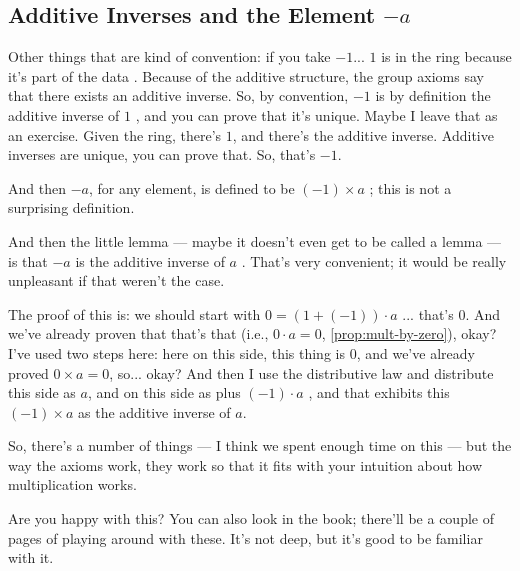 \begin{hidden}
\end{hidden}

\subsection{Additive Inverses and the Element \texorpdfstring{$-a$}{-a}}

\begin{speech}[00:12:43 - 00:15:05]
Other things that are kind of convention: if you take $-1$... $1$ is in the ring because it's part of the data . Because of the additive structure, the group axioms say that there exists an additive inverse. So, by convention, $-1$ is by definition the additive inverse of $1$ , and you can prove that it's unique. Maybe I leave that as an exercise. Given the ring, there's $1$, and there's the additive inverse. Additive inverses are unique, you can prove that. So, that's $-1$.

And then $-a$, for any element, is defined to be $(-1) \times a$ ; this is not a surprising definition.

And then the little lemma --- maybe it doesn't even get to be called a lemma --- is that $-a$ is the additive inverse of $a$ . That's very convenient; it would be really unpleasant if that weren't the case.

The proof of this is: we should start with $0 = (1 + (-1)) \cdot a$ ... that's $0$. And we've already proven that that's that (i.e., $0 \cdot a = 0$, \cref{prop:mult-by-zero}), okay? I've used two steps here: here on this side, this thing is $0$, and we've already proved $0 \times a = 0$, so... okay? And then I use the distributive law and distribute this side as $a$, and on this side as plus $(-1) \cdot a$ , and that exhibits this $(-1) \times a$ as the additive inverse of $a$.

So, there's a number of things --- I think we spent enough time on this --- but the way the axioms work, they work so that it fits with your intuition about how multiplication works.

Are you happy with this? You can also look in the book; there'll be a couple of pages of playing around with these. It's not deep, but it's good to be familiar with it.
\end{speech}

